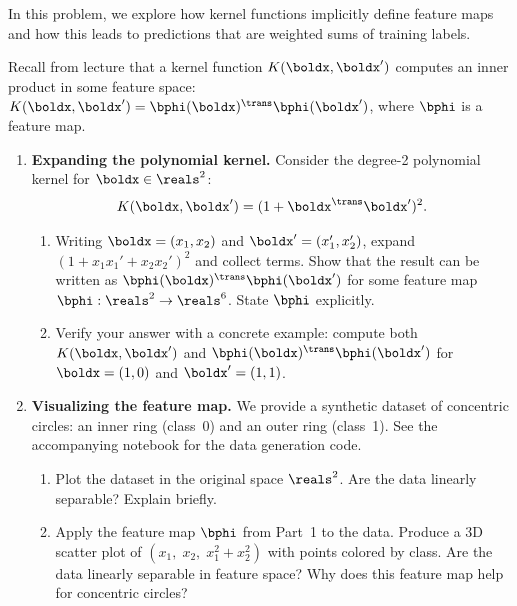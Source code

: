 \documentclass[submit]{../harvardml}
\begin{document}
\begin{problem}

In this problem, we explore how kernel functions implicitly define
feature maps and how this leads to predictions that are weighted sums of
training labels.

Recall from lecture that a kernel function $K(\boldx, \boldx')$ computes
an inner product in some feature space: $K(\boldx, \boldx') =
\bphi(\boldx)^\trans \bphi(\boldx')$, where $\bphi$ is a feature map.

\begin{enumerate}

  \item[1.] \textbf{Expanding the polynomial kernel.}
  Consider the degree-2 polynomial kernel for $\boldx \in \reals^2$:
  \[
    K(\boldx, \boldx') = (1 + \boldx^\trans \boldx')^2.
  \]

  \begin{enumerate}
    \item Writing $\boldx = (x_1, x_2)$ and $\boldx' = (x_1', x_2')$,
    expand $(1 + x_1 x_1' + x_2 x_2')^2$ and collect terms. Show that the
    result can be written as $\bphi(\boldx)^\trans \bphi(\boldx')$ for
    some feature map $\bphi : \reals^2 \to \reals^6$. State $\bphi$
    explicitly.

    \item Verify your answer with a concrete example: compute both
    $K(\boldx, \boldx')$ and $\bphi(\boldx)^\trans \bphi(\boldx')$ for
    $\boldx = (1, 0)$ and $\boldx' = (1, 1)$.
  \end{enumerate}

  \item[2.] \textbf{Visualizing the feature map.}
  We provide a synthetic dataset of concentric circles: an inner ring
  (class~0) and an outer ring (class~1). See the accompanying notebook
  for the data generation code.

  \begin{enumerate}
    \item Plot the dataset in the original space $\reals^2$.
    Are the data linearly separable? Explain briefly.

    \item Apply the feature map $\bphi$ from Part~1 to the data. Produce
    a 3D scatter plot of $(x_1,\; x_2,\; x_1^2 + x_2^2)$ with points
    colored by class. Are the data linearly separable in feature space?
    Why does this feature map help for concentric circles?


\end{enumerate}
\end{enumerate}
\end{problem}
\end{document}

